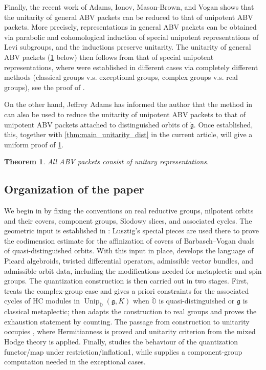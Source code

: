 \documentclass[11pt, a4paper]{amsart}
\newcommand{\g}{\mathfrak{g}}
\newcommand{\orb}{\mathbb{O}}
\newcommand{\fg}{\mathfrak{g}}
\newcommand{\ckfg}{{\check{\fg}}}
\newcommand{\ckorb}{\check{\orb}}
\DeclareMathOperator{\Unip}{Unip}
\newcommand{\UnipOv}{\Unip_{\ckorb}}
\newtheorem{Thm}{Theorem}[subsection]
\theoremstyle{definition}
\numberwithin{equation}{section}
\begin{document}
Finally, the recent work of Adams, Ionov, Mason-Brown, and Vogan \cite{AIMV:ArthurPackets} shows that the unitarity of general ABV packets can be reduced to that of unipotent ABV packets. More precisely, representations in general ABV packets can be obtained via parabolic and cohomological induction of special unipotent representations of Levi subgroups, and the inductions preserve unitarity. The unitarity of general ABV packets (\cref{thm:main_unitarity_ABV} below) then follows from that of special unipotent representations, where were established in different cases via completely different methods (classical groups v.s. exceptional groups, complex groups v.s. real groups), see the proof of \cite[Theorem 1.0.5]{AIMV:ArthurPackets}. 

On the other hand, Jeffrey Adams has informed the author that the method in \cite{AIMV:ArthurPackets} can also be used to reduce the unitarity of unipotent ABV packets to that of unipotent ABV packets attached to distinguished orbits of $\ckfg$.
Once established, this, together with \cref{thm:main_unitarity_dist} in the current article, will give a uniform proof of \cref{thm:main_unitarity_ABV}.

\begin{Thm} \label{thm:main_unitarity_ABV}
	All ABV packets consist of unitary representations.
\end{Thm}


\subsection{Organization of the paper}\label{subsec:organization}

We begin in  by fixing the conventions on real reductive groups, nilpotent orbits and their covers, component groups, Slodowy slices, and associated cycles. The geometric input is established in : Lusztig's special pieces are used there to prove the codimension estimate for the affinization of covers of Barbasch--Vogan duals of quasi-distinguished orbits. With this input in place,  develops the language of Picard algebroids, twisted differential operators, admissible vector bundles, and admissible orbit data, including the modifications needed for metaplectic and spin groups. The quantization construction is then carried out in two stages. First,  treats the complex-group case and gives a priori constraints for the associated cycles of HC modules in $\UnipOv(\g, K)$ when $\ckorb$ is quasi-distinguished or $\g$ is classical metaplectic; then  adapts the construction to real groups and proves the exhaustion statement by counting. The passage from construction to unitarity occupies , where Hermitianness is proved and unitarity criterion from the mixed Hodge theory is applied. Finally,  studies the behaviour of the quantization functor/map under restriction/inflation1, while  supplies a component-group computation needed in the exceptional cases.
\end{document}
